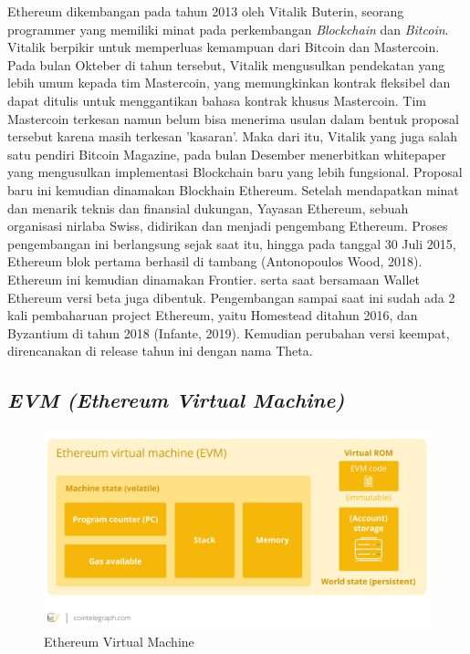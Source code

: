 Ethereum dikembangan pada tahun 2013 oleh Vitalik Buterin, seorang programmer yang memiliki minat pada perkembangan \emph{Blockchain} dan \emph{Bitcoin}.
Vitalik berpikir untuk memperluas kemampuan dari Bitcoin dan Mastercoin. Pada bulan Okteber di tahun tersebut, Vitalik mengusulkan pendekatan yang lebih umum kepada tim
Mastercoin, yang memungkinkan kontrak fleksibel dan dapat ditulis untuk menggantikan
bahasa kontrak khusus Mastercoin. Tim Mastercoin terkesan namun belum bisa menerima usulan dalam bentuk proposal tersebut karena masih terkesan ’kasaran’. Maka dari
itu, Vitalik yang juga salah satu pendiri Bitcoin Magazine, pada bulan Desember menerbitkan whitepaper yang mengusulkan implementasi Blockchain baru yang lebih fungsional.
Proposal baru ini kemudian dinamakan Blockhain Ethereum. Setelah mendapatkan minat
dan menarik teknis dan finansial dukungan, Yayasan Ethereum, sebuah organisasi nirlaba
Swiss, didirikan dan menjadi pengembang Ethereum. Proses pengembangan ini berlangsung sejak saat itu, hingga pada tanggal 30 Juli 2015, Ethereum blok pertama berhasil
di tambang (Antonopoulos Wood, 2018). Ethereum ini kemudian dinamakan Frontier.
serta saat bersamaan Wallet Ethereum versi beta juga dibentuk. Pengembangan sampai saat ini sudah ada 2 kali pembaharuan project Ethereum, yaitu Homestead ditahun
2016, dan Byzantium di tahun 2018 (Infante, 2019). Kemudian perubahan versi keempat,
direncanakan di release tahun ini dengan nama Theta.

\subsection{\emph{EVM (Ethereum Virtual Machine)}}

\begin{figure} [ht] \centering
  \includegraphics[scale=0.3]{gambar/img-evm.png}
  \caption{Ethereum Virtual Machine}
  \label{fig:Metaverse}
\end{figure}

